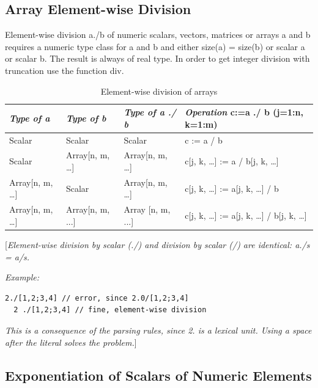\documentclass[10pt,a4paper]{report}
\def\doublelabel#1{\label{#1}}
\begin{document}
\subsection{Array Element-wise Division}\doublelabel{array-element-wise-division}

Element-wise division a./b of numeric scalars, vectors, matrices or
arrays a and b requires a numeric type class for a and b and either
size(a) = size(b) or scalar a or scalar b. The result is always of real
type. In order to get integer division with truncation use the function
div.

\begin{longtable}[]{|l|l|l|l|}
\caption{Element-wise division of arrays}\\
\hline \endhead
\emph{Type of a} & \emph{Type of b} & \emph{Type of a ./ b} &
\emph{Operation} c:=a ./ b (j=1:n, k=1:m)\\ \hline
Scalar & Scalar & Scalar & c := a / b\\ \hline
Scalar & Array{[}n, m, \ldots{}{]} & Array{[}n, m, \ldots{}{]} & c{[}j,
k, \ldots{}{]} := a / b{[}j, k, \ldots{}{]}\\ \hline
Array{[}n, m, \ldots{}{]} & Scalar & Array{[}n, m, \ldots{}{]} & c{[}j,
k, \ldots{}{]} := a{[}j, k, \ldots{}{]} / b\\ \hline
Array{[}n, m, \ldots{}{]} & Array{[}n, m, ...{]} & Array {[}n, m, ...{]}
& c{[}j, k, \ldots{}{]} := a{[}j, k, \ldots{}{]} / b{[}j, k,
\ldots{}{]}\\ \hline

\end{longtable}

{[}\emph{Element-wise division by scalar (./) and division by scalar (/)
are identical: a./s = a/s.}

\emph{Example:}

\begin{lstlisting}[language=modelica]
  2./[1,2;3,4] // error, since 2.0/[1,2;3,4]
  2 ./[1,2;3,4] // fine, element-wise division
\end{lstlisting}
\emph{This is a consequence of the parsing rules, since 2. is a lexical
unit. Using a space after the literal solves the problem.}{]}

\subsection{Exponentiation of Scalars of Numeric Elements}\doublelabel{exponentiation-of-scalars-of-numeric-elements}
\end{document}
